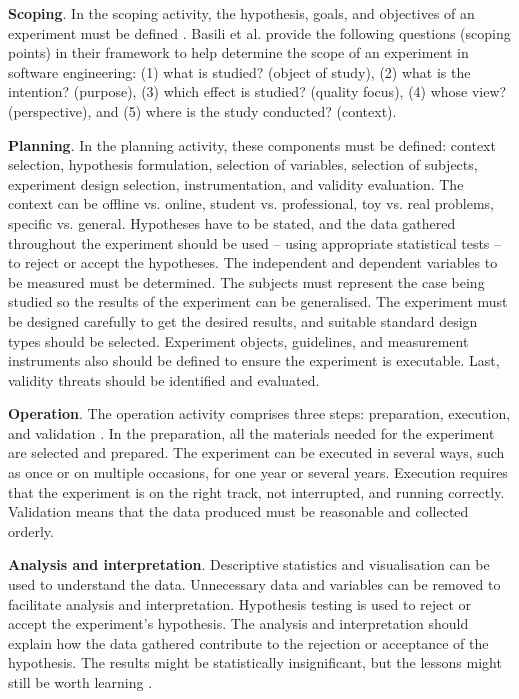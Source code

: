 \textbf{Scoping}. In the scoping activity, the hypothesis, goals, and objectives of an experiment must be defined \cite{DBLP:books/daglib/0029933/Wohlin}. Basili et al. \cite{basili1988tame} provide the following questions (scoping points) in their framework to help determine the scope of an experiment in software engineering: (1) what is studied? (object of study), (2) what is the intention? (purpose), (3) which effect is studied? (quality focus), (4) whose view? (perspective), and (5) where is the study conducted? (context).

\textbf{Planning}. In the planning activity, these components must be defined: context selection, hypothesis formulation, selection of variables, selection of subjects, experiment design selection, instrumentation, and validity evaluation\cite{DBLP:books/daglib/0029933/Wohlin}. The context can be offline vs. online, student vs. professional, toy vs. real problems, specific vs. general. Hypotheses have to be stated, and the data gathered throughout the experiment should be used -- using appropriate statistical tests -- to reject or accept the hypotheses. The independent and dependent variables to be measured must be determined. The subjects must represent the case being studied so the results of the experiment can be generalised. The experiment must be designed carefully to get the desired results, and suitable standard design types should be selected. Experiment objects, guidelines, and measurement instruments also should be defined to ensure the experiment is executable. Last, validity threats should be identified and evaluated.

\textbf{Operation}. The operation activity comprises three steps: preparation, execution, and validation \cite{DBLP:books/daglib/0029933/Wohlin}.
In the preparation, all the materials needed for the experiment are selected and prepared. The experiment can be executed in several ways, such as once or on multiple occasions, for one year or several years. Execution requires that the experiment is on the right track, not interrupted, and running correctly. Validation means that the data produced must be reasonable and collected orderly.

\textbf{Analysis and interpretation}.
Descriptive statistics and visualisation can be used to understand the data. Unnecessary data and variables can be removed to facilitate analysis and interpretation. Hypothesis testing is used to reject or accept the experiment's hypothesis. The analysis and interpretation should explain how the data gathered contribute to the rejection or acceptance of the hypothesis. The results might be statistically insignificant, but the lessons might still be worth learning \cite{DBLP:books/daglib/0029933/Wohlin}.

